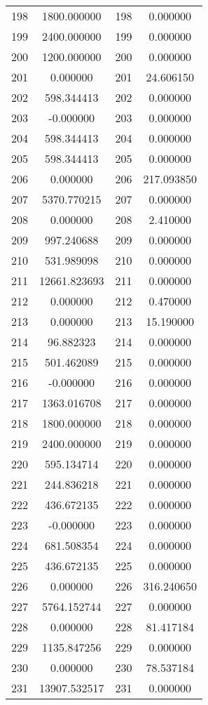 \documentclass[12pt]{article}
\begin{document}
\begin{longtable}{@{}cccc@{}}
198 & 1800.000000 & 198 & 0.000000 \\
199 & 2400.000000 & 199 & 0.000000 \\
200 & 1200.000000 & 200 & 0.000000 \\
201 & 0.000000 & 201 & 24.606150 \\
202 & 598.344413 & 202 & 0.000000 \\
203 & -0.000000 & 203 & 0.000000 \\
204 & 598.344413 & 204 & 0.000000 \\
205 & 598.344413 & 205 & 0.000000 \\
206 & 0.000000 & 206 & 217.093850 \\
207 & 5370.770215 & 207 & 0.000000 \\
208 & 0.000000 & 208 & 2.410000 \\
209 & 997.240688 & 209 & 0.000000 \\
210 & 531.989098 & 210 & 0.000000 \\
211 & 12661.823693 & 211 & 0.000000 \\
212 & 0.000000 & 212 & 0.470000 \\
213 & 0.000000 & 213 & 15.190000 \\
214 & 96.882323 & 214 & 0.000000 \\
215 & 501.462089 & 215 & 0.000000 \\
216 & -0.000000 & 216 & 0.000000 \\
217 & 1363.016708 & 217 & 0.000000 \\
218 & 1800.000000 & 218 & 0.000000 \\
219 & 2400.000000 & 219 & 0.000000 \\
220 & 595.134714 & 220 & 0.000000 \\
221 & 244.836218 & 221 & 0.000000 \\
222 & 436.672135 & 222 & 0.000000 \\
223 & -0.000000 & 223 & 0.000000 \\
224 & 681.508354 & 224 & 0.000000 \\
225 & 436.672135 & 225 & 0.000000 \\
226 & 0.000000 & 226 & 316.240650 \\
227 & 5764.152744 & 227 & 0.000000 \\
228 & 0.000000 & 228 & 81.417184 \\
229 & 1135.847256 & 229 & 0.000000 \\
230 & 0.000000 & 230 & 78.537184 \\
231 & 13907.532517 & 231 & 0.000000 \\

\end{longtable}
\end{document}
